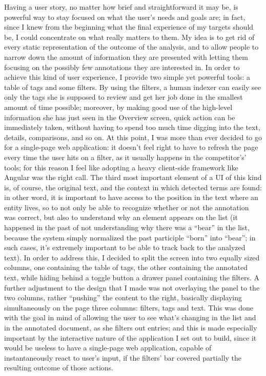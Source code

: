 \documentclass[12pt,svgnames]{memoir}
\begin{document}
Having a user story, no matter how brief and straightforward it may be,
is powerful way to stay focused on what the user's needs and goals are;
in fact, since I knew from the beginning what the final experience of my
targets should be, I could concentrate on what really matters to them.
My idea is to get rid of every static representation of the outcome of
the analysis, and to allow people to narrow down the amount of
information they are presented with letting them focusing on the
possibly few annotations they are interested in. In order to achieve
this kind of user experience, I provide two simple yet powerful tools: a
table of tags and some filters. By using the filters, a human indexer
can easily see only the tags she is supposed to review and get her job
done in the smallest amount of time possible; moreover, by making good
use of the high-level information she has just seen in the Overview
screen, quick action can be immediately taken, without having to spend
too much time digging into the text, details, comparisons, and so on. At
this point, I was more than ever decided to go for a single-page web
application: it doesn't feel right to have to refresh the page every
time the user hits on a filter, as it usually happens in the
competitor's' tools; for this reason I feel like adopting a heavy
client-side framework like Angular was the right call. The third most
important element of a UI of this kind is, of course, the original text,
and the context in which detected terms are found: in other word, it is
important to have access to the position in the text where an entity
lives, so to not only be able to recognize whether or not the annotation
was correct, but also to understand why an element appears on the list
(it happened in the past of not understanding why there was a ``bear''
in the list, because the system simply normalized the past participle
``born'' into ``bear''; in such cases, it's extremely important to be
able to track back to the analyzed text). In order to address this, I
decided to split the screen into two equally sized columns, one
containing the table of tags, the other containing the annotated text,
while hiding behind a toggle button a drawer panel containing the
filters. A further adjustment to the design that I made was not
overlaying the panel to the two columns, rather ``pushing'' the content
to the right, basically displaying simultaneously on the page three
columns: filters, tags and text. This was done with the goal in mind of
allowing the user to see what's changing in the list and in the
annotated document, as she filters out entries; and this is made
especially important by the interactive nature of the application I set
out to build, since it would be useless to have a single-page web
application, capable of instantaneously react to user's input, if the
filters' bar covered partially the resulting outcome of those actions.
\end{document}
